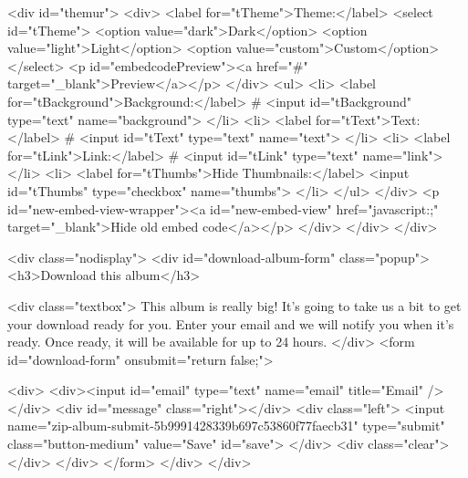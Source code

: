             <div id="themur">
                <div>
                    <label for="tTheme">Theme:</label>
                    <select id="tTheme">
                        <option value="dark">Dark</option>
                        <option value="light">Light</option>
                        <option value="custom">Custom</option>
                    </select>
                    <p id="embedcodePreview"><a href="#" target="_blank">Preview</a></p>
                </div>
                <ul>
                    <li>
                        <label for="tBackground">Background:</label> # <input id="tBackground" type="text" name="background">
                    </li>
                    <li>
                        <label for="tText">Text:</label> # <input id="tText" type="text" name="text">
                    </li>
                    <li>
                        <label for="tLink">Link:</label> # <input id="tLink" type="text" name="link">
                    </li>
                    <li>
                        <label for="tThumbs">Hide Thumbnails:</label> <input id="tThumbs" type="checkbox" name="thumbs">
                    </li>
                </ul>
            </div>
            <p id="new-embed-view-wrapper"><a id="new-embed-view" href="javascript:;" target="_blank">Hide old embed code</a></p>
        </div>
    </div>
</div>

    <div class="nodisplay">
	<div id="download-album-form" class="popup">
		<h3>Download this album</h3>
		
		<div class="textbox">
			This album is really big! It's going to take us a bit to get your download ready for you.  Enter your email and we will notify you when it's ready. Once ready, it will be available for up to 24 hours.
		</div>
        <form id="download-form" onsubmit="return false;">
		
		<div>
            <div><input id="email" type="text" name="email" title="Email" /></div>
            <div id="message" class="right"></div>
            <div class="left">
                <input name="zip-album-submit-5b9991428339b697c53860f77faecb31" type="submit" class="button-medium" value="Save" id="save">
            </div>
            <div class="clear"></div>
        </div>
        </form>
	</div>
</div>

